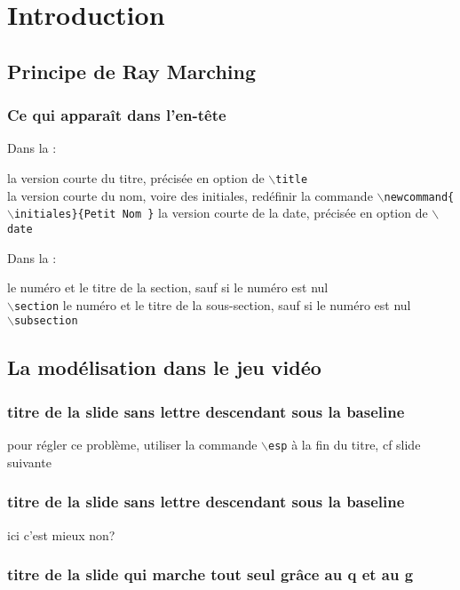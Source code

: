 \section[Première section]{Introduction}

\subsection{Principe de Ray Marching}


\begin{frame}
\frametitle{Ce qui apparaît dans l'en-tête}

Dans la :
\begin{itemize}
\flch la version courte du titre, précisée en option  de  \texttt{$\backslash$title}\\
\flch la version courte du nom, voire des initiales, redéfinir la commande
\texttt{$\backslash$newcommand\{$\backslash$initiales\}\{Petit Nom \}} 
\flch la version courte de la date, précisée en option de \texttt{$\backslash$date}\\
\end{itemize}
\bigskip
Dans la :
\begin{itemize}
\flch le numéro et le titre de la section, sauf si le numéro est nul\\
 \texttt{$\backslash$section}
\flch le numéro et le titre de la sous-section, sauf si le numéro est nul\\
 \texttt{$\backslash$subsection}
\end{itemize}

\end{frame}


\subsection{La modélisation dans le jeu vidéo}
\begin{frame}
\frametitle{titre de la slide sans lettre descendant sous la baseline}
pour régler ce problème, utiliser la commande \texttt{$\backslash$esp} à la fin du titre, cf slide suivante
\end{frame}


\begin{frame}
\frametitle{titre de la slide sans lettre descendant sous la baseline\esp}
ici c'est mieux non?
\end{frame}


\begin{frame}[fragile]
\frametitle{titre de la slide qui marche tout seul grâce au q et au g}
\end{frame}

